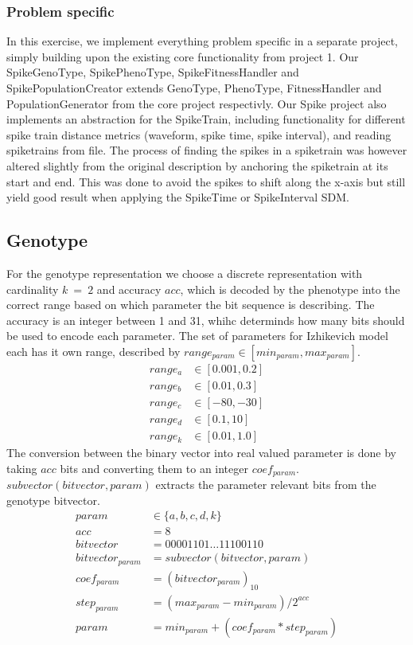 \documentclass[10pt]{article}
\begin{document}
		\subsubsection{Problem specific}\label{sec:specific}
				In this exercise, we implement everything problem specific in a separate project, simply building upon the existing core functionality from project 1. Our SpikeGenoType, SpikePhenoType, SpikeFitnessHandler and SpikePopulationCreator extends GenoType, PhenoType, FitnessHandler and PopulationGenerator from the core project respectivly.
		Our Spike project also implements an abstraction for the SpikeTrain, including functionality for different spike train distance metrics (waveform, spike time, spike interval), and reading spiketrains from file. The process of finding the spikes in a spiketrain was however altered slightly from the original description by anchoring the spiketrain at its start and end. This was done to avoid the spikes to shift along the x-axis but still yield good result when applying the SpikeTime or SpikeInterval SDM.
	\subsection{Genotype}\label{sec:geno}
		For the genotype representation we choose a discrete representation with cardinality $k~=~2$ and accuracy $acc$, which is decoded by the phenotype into the correct range based on which parameter the bit sequence is describing. The accuracy is an integer between 1 and 31, whihc determinds how many bits should be used to encode each parameter. The set of parameters for Izhikevich model each has it own range, described by $range_{param} \in [min_{param}, max_{param}]$. 
		\begin{align}
			range_a &\in [0.001, 0.2]\nonumber\\
			range_b &\in [0.01, 0.3]\nonumber\\
			range_c &\in [-80, -30]\nonumber\\
			range_d &\in [0.1, 10]\nonumber\\
			range_k &\in [0.01, 1.0]\nonumber
		\end{align}
		The conversion between the binary vector into real valued parameter is done by taking $acc$ bits and converting them to an integer $coef_{param}$. $subvector(bitvector, param)$ extracts the parameter relevant bits from the genotype bitvector.
		\begin{align}
			param &\in \{a, b, c, d, k\}\nonumber\\
			acc &= 8\nonumber\\
			bitvector &= 00001101\dots11100110\nonumber\\
			bitvector_{param} &= subvector(bitvector, param)\nonumber\\
			coef_{param} &= (bitvector_{param})_{10}\nonumber\\
			step_{param} &= (max_{param}-min_{param})/2^{acc}\nonumber\\
			param &= min_{param}+(coef_{param}*step_{param})\nonumber
		\end{align}
\end{document}

